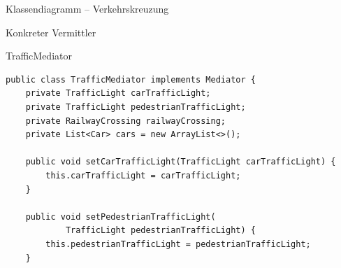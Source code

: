 
\begin{frame}{Klassendiagramm -- Verkehrskreuzung}
\end{frame}

\begin{frame}[fragile]{Konkreter Vermittler}
	\begin{exampleblock}{TrafficMediator}
 		\begin{lstlisting}
public class TrafficMediator implements Mediator {
	private TrafficLight carTrafficLight;
	private TrafficLight pedestrianTrafficLight;
	private RailwayCrossing railwayCrossing;
	private List<Car> cars = new ArrayList<>();

	public void setCarTrafficLight(TrafficLight carTrafficLight) {
		this.carTrafficLight = carTrafficLight;
	}

	public void setPedestrianTrafficLight(
            TrafficLight pedestrianTrafficLight) {
		this.pedestrianTrafficLight = pedestrianTrafficLight;
	}
        \end{lstlisting}
 	\end{exampleblock}
\end{frame}


